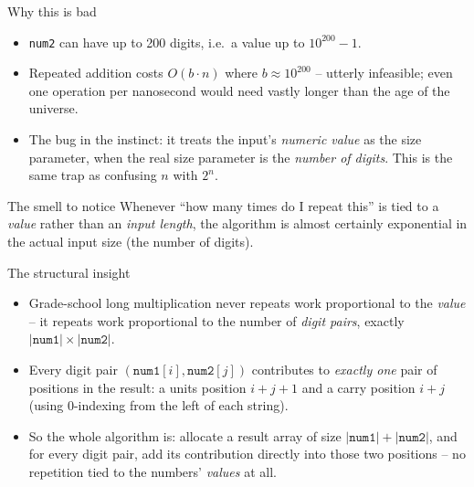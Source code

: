 \documentclass[11pt,aspectratio=169]{beamer}
\begin{document}
\begin{frame}{Why this is bad}
  \begin{itemize}
    \item \texttt{num2} can have up to 200 digits, i.e.\ a value up to $10^{200}-1$.
    \item Repeated addition costs $O(b \cdot n)$ where $b \approx 10^{200}$ -- utterly
    infeasible; even one operation per nanosecond would need vastly longer than the age
    of the universe.
    \item The bug in the instinct: it treats the input's \emph{numeric value} as the
    size parameter, when the real size parameter is the \emph{number of digits}. This is
    the same trap as confusing $n$ with $2^n$.
  \end{itemize}
  \begin{alertblock}{The smell to notice}
    Whenever ``how many times do I repeat this'' is tied to a \emph{value} rather than
    an \emph{input length}, the algorithm is almost certainly exponential in the actual
    input size (the number of digits).
  \end{alertblock}
\end{frame}

\begin{frame}{The structural insight}
  \begin{itemize}
    \item Grade-school long multiplication never repeats work proportional to the
    \emph{value} -- it repeats work proportional to the number of \emph{digit pairs},
    exactly $|\texttt{num1}| \times |\texttt{num2}|$.
    \item Every digit pair $(\texttt{num1}[i], \texttt{num2}[j])$ contributes to
    \emph{exactly one} pair of positions in the result: a units position
    $i+j+1$ and a carry position $i+j$ (using 0-indexing from the left of each string).
    \item So the whole algorithm is: allocate a result array of size $|\texttt{num1}| +
    |\texttt{num2}|$, and for every digit pair, add its contribution directly into those
    two positions -- no repetition tied to the numbers' \emph{values} at all.
  \end{itemize}
\end{frame}
\end{document}
